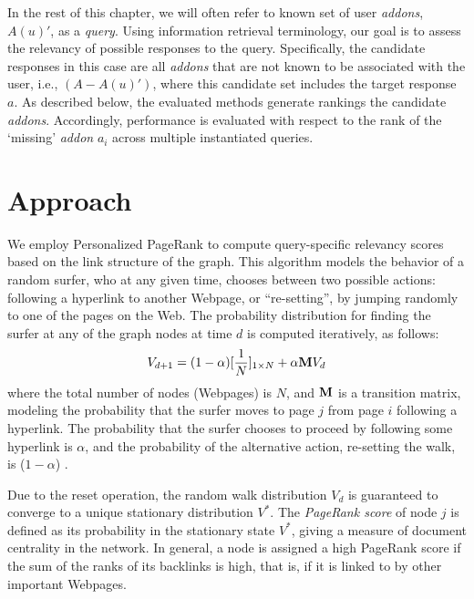 \documentclass[11pt,oneside]{book}
\let\Oldsection\section
\renewcommand{\section}{\FloatBarrier\Oldsection}
\newcommand{\transition}{{\bf M}}
\begin{document}
In the rest of this chapter, we will often refer to known set of user \textit{addons}, $A(u)'$, as a {\it query}. Using information retrieval terminology, our goal is to assess the relevancy of possible responses to the query. Specifically, the candidate responses in this case are all {\it addons} that are not known to be associated with the user, i.e., $(A-A(u)')$, where this candidate set includes the target response $a$. As described below, the evaluated methods generate rankings the candidate {\it addons}. Accordingly, performance is evaluated with respect to the rank of the `missing' {\it addon} $a_i$ across multiple instantiated queries. 

\section{Approach}
\label{sec:method}

We employ Personalized PageRank \citep{page1999pagerank} to compute query-specific relevancy scores based on the link structure of the graph. This algorithm models the behavior of a random surfer, who at any given time, chooses
between two possible actions: following a hyperlink to another Webpage, or ``re-setting'', by jumping randomly to one of the pages on the Web. The probability distribution for finding the surfer at any of the graph nodes at time $d$ is computed iteratively, as follows:
\begin{equation}
V_{d+1} = (1-\alpha) [{1 \over N}]_{1 \times N} + \alpha \transition V_d
\label{eq:pagerank}
\end{equation}
where the total number of nodes (Webpages) is $N$, and $\transition$
is a transition matrix, modeling the probability that the surfer moves
to page $j$ from page $i$ following a hyperlink. The probability that
the surfer chooses to proceed by following some hyperlink is $\alpha$, and the
probability of the alternative action, re-setting the walk, is ($1-\alpha$) .

Due to the reset operation, the random walk distribution $V_d$ is guaranteed to
converge to a unique stationary distribution $V^*$. The {\it PageRank score} of node $j$ is defined as its probability in the stationary state $V^*$, giving a measure of document centrality in the network. In general, a node is
assigned a high PageRank score if the sum of the ranks of its
backlinks is high, that is, if it is linked to by other important
Webpages.
\end{document}
